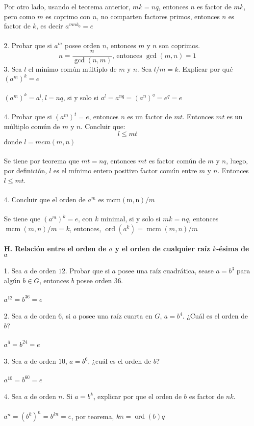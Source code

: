 \documentclass{article}
\begin{document}
\\
\\
Por otro lado, usando el teorema anterior, $mk=nq$, entonces $n$ es factor de $mk$, pero como $m$ es coprimo con $n$, no comparten factores primos, entonces $n$ es factor de $k$, es decir $a^{mnk_{0}}=e$
\\
\\
2. Probar que si $a^{m}$ posee orden $n$, entonces $m$ y $n$ son coprimos.
\begin{equation*}
    n=\frac{n}{\gcd{(n,m)}} \text{, entonces } \gcd{(m,n)}=1
\end{equation*}
3. Sea $l$ el mínimo común múltiplo de $m$ y $n$. Sea $l/m=k$. Explicar por qué $(a^{m})^{k}=e$
\\
\\
$(a^{m})^{k}=a^{l}, l=nq$, si y solo si $a^{l}=a^{nq}=(a^{n})^{q}=e^{q}=e$
\\
\\
4. Probar que si $(a^m)^t=e$, entonces $n$ es un factor de $mt$. Entonces $mt$ es un múltiplo común de $m$ y $n$. Concluir que:
\begin{equation*}
    l \leq mt
\end{equation*}
donde $l=mcm(m,n)$
\\
\\
Se tiene por teorema que $mt=nq$, entonces $mt$ es factor común de $m$ y $n$, luego, por definición, $l$ es el mínimo entero positivo factor común entre $m$ y $n$. Entonces $l \leq mt$.
\\
\\
4. Concluir que el orden de $a^{m}$ es $\operatorname{mcm(m,n)}/m$
\\
\\
Se tiene que $(a^{m})^{k}=e$, con $k$ minimal, si y solo si $mk=nq$, entonces $\operatorname{mcm}(m,n)/m=k$, entonces, $\operatorname{ord}(a^{k})=\operatorname{mcm}(m,n)/m$
\\
\\
\textbf{H. Relación entre el orden de $a$ y el orden de cualquier raíz $k$-ésima de $a$}
\\
\\
1. Sea $a$ de orden $12$. Probar que si $a$ posee una raíz cuadrática, sease $a=b^{3}$ para algún $b \in G$, entonces $b$ posee orden 36.
\\
\\
$a^{12}=b^{36}=e$
\\
\\
2. Sea $a$ de orden $6$, si $a$ posee una raíz cuarta en $G$, $a=b^4$. ¿Cuál es el orden de $b$?
\\
\\
$a^6=b^{24}=e$
\\
\\
3. Sea $a$ de orden $10$, $a=b^6$, ¿cuál es el orden de $b$?
\\
\\
$a^{10}=b^{60}=e$
\\
\\
4. Sea $a$ de orden $n$. Si $a=b^{k}$, explicar por que el orden de $b$ es factor de $nk$.
\\
\\
$a^{n}=(b^{k})^{n}=b^{kn}=e$, por teorema, $kn=\operatorname{ord}(b)q$
\end{document}
